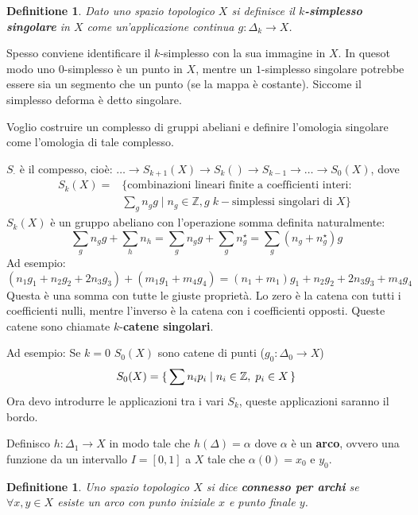 \documentclass{article}
\newtheorem{definition}[theorem]{Definitione}
\newcommand{\Z}{\mathbb{Z}}
\begin{document}
\begin{definition}
  Dato uno spazio topologico $ X $ si definisce il \textbf{$ k $-simplesso singolare}
  in $ X $ come un'applicazione continua $ g: \Delta_k \to X $.
\end{definition}
Spesso conviene identificare il $ k $-simplesso con la sua immagine in $ X $.
In quesot modo uno $ 0 $-simplesso è un punto in $ X $, mentre un $ 1 $-simplesso singolare potrebbe essere sia un segmento che un punto (se la mappa è costante). Siccome
il simplesso deforma è detto singolare.

Voglio costruire un complesso di gruppi abeliani e definire l'omologia singolare come l'omologia di tale complesso.

$ S_\cdot $ è il compesso, cioè: $ \dots \to S_{k+1}(X) \to S_k() \to S_{k-1} \to \dots \to S_0(X) $, dove
\begin{align*}
  S_k(X) ={}& \{\text{combinazioni lineari finite a coefficienti interi: } \\
         & \sum_g n_g g \;|\; n_g \in \Z, g \; k-\text{simplessi singolari di } X \}
\end{align*}
$ S_k(X) $ è un gruppo abeliano con l'operazione somma definita naturalmente:
\[
  \sum_g n_g g + \sum_h n_h =   \sum_g n_g g + \sum_g n_g^\star = \sum_g (n_g + n_g^\star)g
\]
Ad esempio:
\[
  (n_1 g_1 + n_2 g_2 + 2 n_3 g_3) + (m_1 g_1 + m_4 g_4) = (n_1 + m_1)g_1 + n_2 g_2 + 2 n_3 g_3 + m_4 g_4
\]
Questa è una somma con tutte le giuste proprietà. Lo zero è la catena con tutti i coefficienti nulli,
mentre l'inverso è la catena con i coefficienti opposti.
Queste catene sono chiamate $ k $-\textbf{catene singolari}.

Ad esempio:
Se $ k = 0 $ $ S_0(X) $ sono catene di punti ($ g_0 : \Delta_0 \to X $)
\[
  S_0(X) = \set { \sum n_i p_i | n_i \in \Z, \; p_i \in X}
\]
Ora devo introdurre le applicazioni tra i vari $ S_k $, queste applicazioni saranno il bordo.

Definisco $ h: \Delta_1 \to X $ in modo tale che $ h(\Delta) = \alpha $ dove $ \alpha $ è un \textbf{arco},  ovvero una funzione
da un intervallo $ I = [0,1] $ a $ X $ tale che $ \alpha(0) = x_0 $ e $ y_0 $.

\begin{definition}
  Uno spazio topologico $ X $ si dice \textbf{connesso per archi}  se $ \forall x, y \in X $ esiste
  un arco con punto iniziale $ x $ e punto finale $ y $.
\end{definition}
\end{document}
